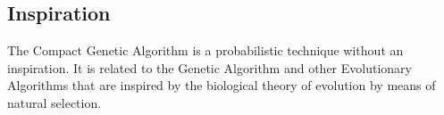 \subsection{Inspiration}
The Compact Genetic Algorithm is a probabilistic technique without an inspiration. It is related to the Genetic Algorithm and other Evolutionary Algorithms that are inspired by the biological theory of evolution by means of natural selection.


